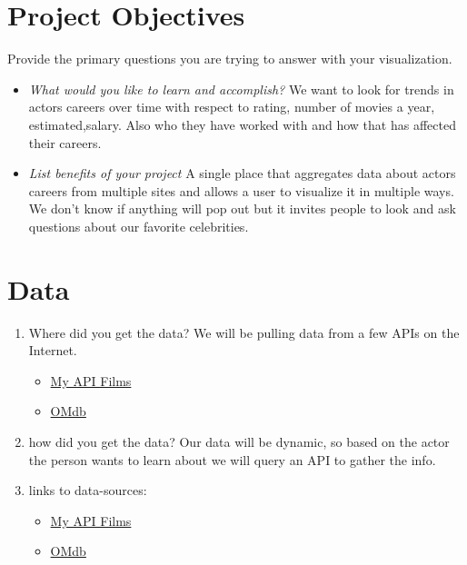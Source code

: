 \documentclass[12pt]{article}
\begin{document}
\section{Project Objectives}
Provide the primary questions you are trying to answer with your visualization. 
\begin{itemize}

    \item  {\it What would you like to learn and accomplish?}
    We want to look for trends in actors careers over time with respect to rating, number of movies a year, estimated,salary. Also who they have worked with and how that has affected their careers.

    \item  {\it List benefits of your project}
    A single place that aggregates data about actors careers from multiple sites and allows a user to visualize it in multiple ways. We don't know if anything will pop out but it invites people to look and ask questions about our favorite celebrities.  

\end{itemize}

\section{Data}
\begin{enumerate}
    \item Where did you get the data?
        We will be pulling data from a few APIs on the Internet. 
        \begin{itemize}
            \item \href{http://www.myapifilms.com/}{My API Films}
            \item \href{www.omdbapi.com}{OMdb}
        \end{itemize}
    
    \item how did you get the data?
        Our data will be dynamic, so based on the actor the person wants to learn about we will query an API to gather the info. 
    
    \item links to data-sources:
    \begin{itemize}
        \item \href{http://www.myapifilms.com/}{My API Films}
        \item \href{www.omdbapi.com}{OMdb}
    \end{itemize}
\end{enumerate}
\end{document}
